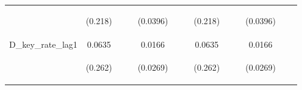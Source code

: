 \documentclass[]{article}
\begin{document}
\begin{center}
\begin{tabular}{lcccccccccccc}
\vspace{4pt} & \begin{footnotesize}(0.218)\end{footnotesize} & \begin{footnotesize}\end{footnotesize} & \begin{footnotesize}\end{footnotesize} & \begin{footnotesize}(0.0396)\end{footnotesize} & \begin{footnotesize}\end{footnotesize} & \begin{footnotesize}\end{footnotesize} & \begin{footnotesize}(0.218)\end{footnotesize} & \begin{footnotesize}\end{footnotesize} & \begin{footnotesize}\end{footnotesize} & \begin{footnotesize}(0.0396)\end{footnotesize} & \begin{footnotesize}\end{footnotesize} & \begin{footnotesize}\end{footnotesize} \\
D\_key\_rate\_lag1 & 0.0635 &  &  & 0.0166 &  &  & 0.0635 &  &  & 0.0166 &  &  \\
\vspace{4pt} & \begin{footnotesize}(0.262)\end{footnotesize} & \begin{footnotesize}\end{footnotesize} & \begin{footnotesize}\end{footnotesize} & \begin{footnotesize}(0.0269)\end{footnotesize} & \begin{footnotesize}\end{footnotesize} & \begin{footnotesize}\end{footnotesize} & \begin{footnotesize}(0.262)\end{footnotesize} & \begin{footnotesize}\end{footnotesize} & \begin{footnotesize}\end{footnotesize} & \begin{footnotesize}(0.0269)\end{footnotesize} & \begin{footnotesize}\end{footnotesize} & \begin{footnotesize}\end{footnotesize} \\

\end{tabular}
\end{center}
\end{document}
